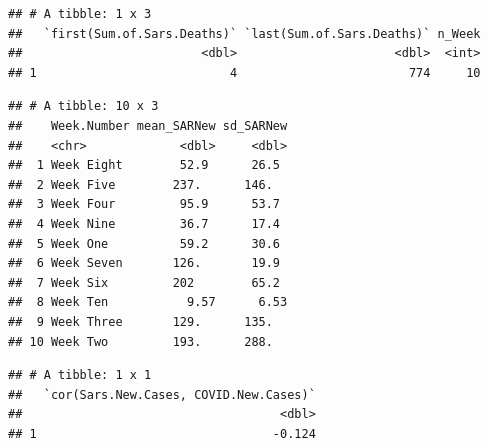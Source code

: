\documentclass[
]{article}
\newenvironment{Shaded}{\begin{snugshade}}{\end{snugshade}}
\newcommand{\DataTypeTok}[1]{\textcolor[rgb]{0.13,0.29,0.53}{#1}}
\newcommand{\DecValTok}[1]{\textcolor[rgb]{0.00,0.00,0.81}{#1}}
\newcommand{\KeywordTok}[1]{\textcolor[rgb]{0.13,0.29,0.53}{\textbf{#1}}}
\newcommand{\NormalTok}[1]{#1}
\newcommand{\OperatorTok}[1]{\textcolor[rgb]{0.81,0.36,0.00}{\textbf{#1}}}
\newcommand{\StringTok}[1]{\textcolor[rgb]{0.31,0.60,0.02}{#1}}
\begin{document}
\begin{verbatim}
## # A tibble: 1 x 3
##   `first(Sum.of.Sars.Deaths)` `last(Sum.of.Sars.Deaths)` n_Week
##                         <dbl>                      <dbl>  <int>
## 1                           4                        774     10
\end{verbatim}

\begin{Shaded}
\end{Shaded}

\begin{verbatim}
## # A tibble: 10 x 3
##    Week.Number mean_SARNew sd_SARNew
##    <chr>             <dbl>     <dbl>
##  1 Week Eight        52.9      26.5 
##  2 Week Five        237.      146.  
##  3 Week Four         95.9      53.7 
##  4 Week Nine         36.7      17.4 
##  5 Week One          59.2      30.6 
##  6 Week Seven       126.       19.9 
##  7 Week Six         202        65.2 
##  8 Week Ten           9.57      6.53
##  9 Week Three       129.      135.  
## 10 Week Two         193.      288.
\end{verbatim}

\begin{Shaded}
\end{Shaded}

\begin{verbatim}
## # A tibble: 1 x 1
##   `cor(Sars.New.Cases, COVID.New.Cases)`
##                                    <dbl>
## 1                                 -0.124
\end{verbatim}

\begin{Shaded}
\end{Shaded}
\end{document}

